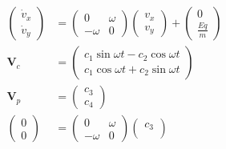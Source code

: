 \documentclass{article}
\begin{document}
\begin{enumerate}
        \begin{align*}
          \begin{pmatrix}
            \dot{v}_x \\
            \dot{v}_y
          \end{pmatrix} & = \begin{pmatrix}
                              0       & \omega \\
                              -\omega & 0
                            \end{pmatrix} \begin{pmatrix}
                                            v_x \\
                                            v_y
                                          \end{pmatrix} + \begin{pmatrix}
                                                            0 \\
                                                            \frac{E q}{m}
                                                          \end{pmatrix}          \\
          \mathbf{V}_c    & = \begin{pmatrix}
                                c_1 \sin \omega t - c_2 \cos \omega t \\
                                c_1 \cos \omega t + c_2 \sin \omega t
                              \end{pmatrix}               \\
          \mathbf{V}_p    & = \begin{pmatrix}
                                c_3 \\
                                c_4
                              \end{pmatrix}                                      \\
          \begin{pmatrix}
            0 \\
            0
          \end{pmatrix} & = \begin{pmatrix}
                              0       & \omega \\
                              -\omega & 0
                            \end{pmatrix} \begin{pmatrix}
                                            c_3 \\

\end{pmatrix}
\end{align*}
\end{enumerate}
\end{document}
